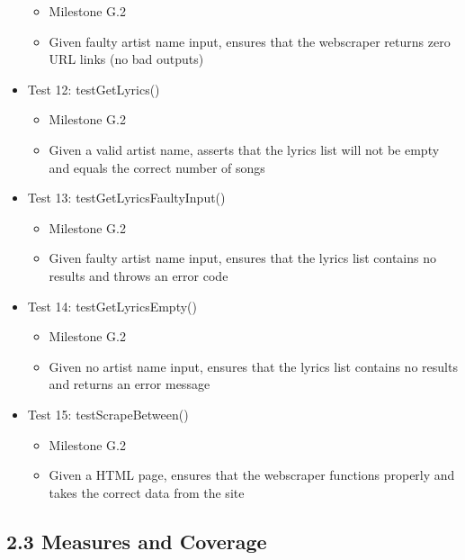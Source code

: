 \documentclass[]{article}
\begin{document}
\begin{itemize}
  \begin{itemize}
  \itemsep1pt\parskip0pt
  \item
    Milestone G.2
  \item
    Given faulty artist name input, ensures that the webscraper returns
    zero URL links (no bad outputs)
  \end{itemize}
\item
  Test 12: testGetLyrics()

  \begin{itemize}
  \itemsep1pt\parskip0pt
  \item
    Milestone G.2
  \item
    Given a valid artist name, asserts that the lyrics list will not be
    empty and equals the correct number of songs
  \end{itemize}
\item
  Test 13: testGetLyricsFaultyInput()

  \begin{itemize}
  \itemsep1pt\parskip0pt
  \item
    Milestone G.2
  \item
    Given faulty artist name input, ensures that the lyrics list
    contains no results and throws an error code
  \end{itemize}
\item
  Test 14: testGetLyricsEmpty()

  \begin{itemize}
  \itemsep1pt\parskip0pt
  \item
    Milestone G.2
  \item
    Given no artist name input, ensures that the lyrics list contains no
    results and returns an error message
  \end{itemize}
\item
  Test 15: testScrapeBetween()

  \begin{itemize}
  \itemsep1pt\parskip0pt
  \item
    Milestone G.2
  \item
    Given a HTML page, ensures that the webscraper functions properly
    and takes the correct data from the site
  \end{itemize}
\end{itemize}

\subsection{\textbf{2.3 Measures and
Coverage}}\label{measures-and-coverage}
\end{document}
